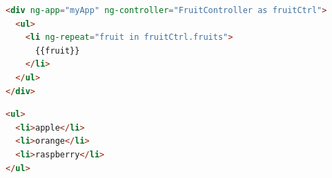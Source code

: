 \begin{lstlisting}[language=html, caption=AngularJS template, label=lst:angular-view]
<div ng-app="myApp" ng-controller="FruitController as fruitCtrl">
  <ul>
    <li ng-repeat="fruit in fruitCtrl.fruits">
      {{fruit}}
    </li>
  </ul>
</div>
\end{lstlisting}

\begin{lstlisting}[language=html, caption=HTML result, label=lst:angular-result]
<ul>
  <li>apple</li>
  <li>orange</li>
  <li>raspberry</li>
</ul>
\end{lstlisting}


